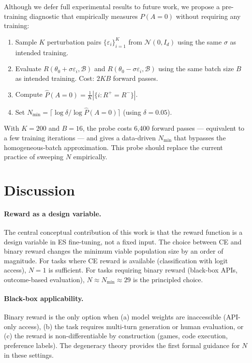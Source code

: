 \documentclass[11pt]{article}
\theoremstyle{definition}
\theoremstyle{remark}
\newcommand{\Nmin}{N_{\mathrm{min}}}
\begin{document}
Although we defer full experimental results to future work, we propose a pre-training diagnostic that empirically measures $P(A=0)$ without requiring any training:

\begin{enumerate}[leftmargin=*]
  \item Sample $K$ perturbation pairs $\{\varepsilon_i\}_{i=1}^K$ from $\mathcal{N}(0, I_d)$ using the same $\sigma$ as intended training.
  \item Evaluate $R(\theta_0 + \sigma\varepsilon_i, \mathcal{B})$ and $R(\theta_0 - \sigma\varepsilon_i, \mathcal{B})$ using the same batch size $B$ as intended training. Cost: $2KB$ forward passes.
  \item Compute $\hat P(A=0) = \frac{1}{K}|\{i : R^+ = R^-\}|$.
  \item Set $\Nmin = \lceil \log \delta / \log \hat P(A=0) \rceil$ (using $\delta = 0.05$).
\end{enumerate}

With $K = 200$ and $B = 16$, the probe costs 6,400 forward passes --- equivalent to a few training iterations --- and gives a data-driven $\Nmin$ that bypasses the homogeneous-batch approximation. This probe should replace the current practice of sweeping $N$ empirically.

\section{Discussion}
\label{sec:discussion}

\paragraph{Reward as a design variable.}
The central conceptual contribution of this work is that the reward function is a design variable in ES fine-tuning, not a fixed input. The choice between CE and binary reward changes the minimum viable population size by an order of magnitude. For tasks where CE reward is available (classification with logit access), $N=1$ is sufficient. For tasks requiring binary reward (black-box APIs, outcome-based evaluation), $N \approx \Nmin \approx 29$ is the principled choice.

\paragraph{Black-box applicability.}
Binary reward is the only option when (a) model weights are inaccessible (API-only access), (b) the task requires multi-turn generation or human evaluation, or (c) the reward is non-differentiable by construction (games, code execution, preference labels). The degeneracy theory provides the first formal guidance for $N$ in these settings.
\end{document}
